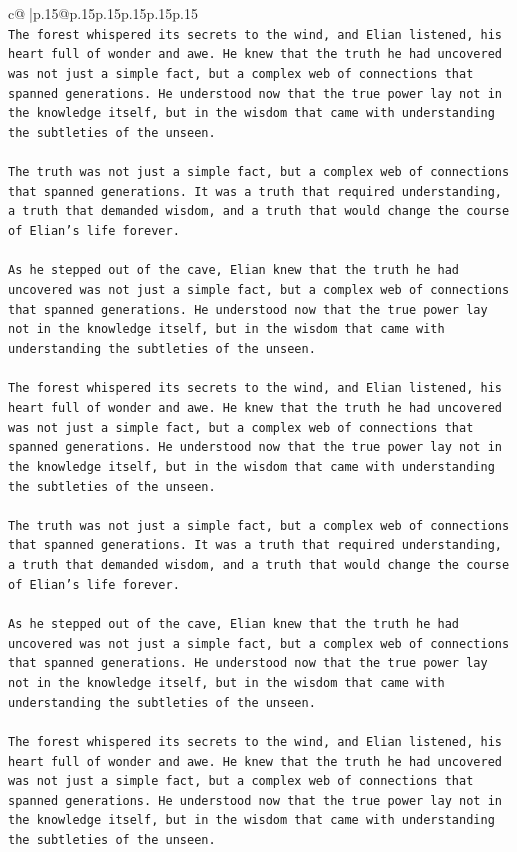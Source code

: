 \documentclass{article}
\begin{document}
{\begin{supertabular}{c@{$\;$}|p{.15\linewidth}@{}p{.15\linewidth}p{.15\linewidth}p{.15\linewidth}p{.15\linewidth}p{.15\linewidth}}
{{{\\ 
\texttt{The forest whispered its secrets to the wind, and Elian listened, his heart full of wonder and awe. He knew that the truth he had uncovered was not just a simple fact, but a complex web of connections that spanned generations. He understood now that the true power lay not in the knowledge itself, but in the wisdom that came with understanding the subtleties of the unseen.} \\
\\ 
\texttt{The truth was not just a simple fact, but a complex web of connections that spanned generations. It was a truth that required understanding, a truth that demanded wisdom, and a truth that would change the course of Elian's life forever.} \\
\\ 
\texttt{As he stepped out of the cave, Elian knew that the truth he had uncovered was not just a simple fact, but a complex web of connections that spanned generations. He understood now that the true power lay not in the knowledge itself, but in the wisdom that came with understanding the subtleties of the unseen.} \\
\\ 
\texttt{The forest whispered its secrets to the wind, and Elian listened, his heart full of wonder and awe. He knew that the truth he had uncovered was not just a simple fact, but a complex web of connections that spanned generations. He understood now that the true power lay not in the knowledge itself, but in the wisdom that came with understanding the subtleties of the unseen.} \\
\\ 
\texttt{The truth was not just a simple fact, but a complex web of connections that spanned generations. It was a truth that required understanding, a truth that demanded wisdom, and a truth that would change the course of Elian's life forever.} \\
\\ 
\texttt{As he stepped out of the cave, Elian knew that the truth he had uncovered was not just a simple fact, but a complex web of connections that spanned generations. He understood now that the true power lay not in the knowledge itself, but in the wisdom that came with understanding the subtleties of the unseen.} \\
\\ 
\texttt{The forest whispered its secrets to the wind, and Elian listened, his heart full of wonder and awe. He knew that the truth he had uncovered was not just a simple fact, but a complex web of connections that spanned generations. He understood now that the true power lay not in the knowledge itself, but in the wisdom that came with understanding the subtleties of the unseen.} \\
}}}
\end{supertabular}}
\end{document}
